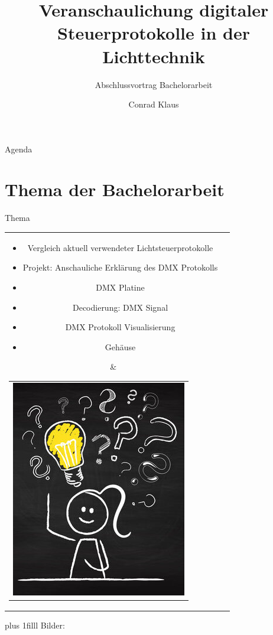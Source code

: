 \documentclass[Nike]{tuberlinbeamer}
\title{Veranschaulichung digitaler Steuerprotokolle in der Lichttechnik}
\subtitle{Abschlussvortrag Bachelorarbeit}
\author[Conrad Klaus]{Conrad Klaus}
\institute{Fachgebiet Lichttechnik}
\newcommand{\customcite}[1]{
	\vskip0pt plus 1filll
	\color{grau}
	\raggedleft \tiny Bilder: \cite{#1}
}
\begin{document}
\begin{frame}
	\maketitle
\end{frame}
\begin{frame}{Agenda}
	\tableofcontents
\end{frame}


\section{Thema der Bachelorarbeit}


\begin{frame}{Thema}
	\begin{tabular}{cl}  
		\parbox{0.45\linewidth}{
			\begin{itemize}
				\item Vergleich aktuell verwendeter Lichtsteuerprotokolle
				\item Projekt: Anschauliche Erklärung des DMX Protokolls
				\item DMX Platine
				\item Decodierung: DMX Signal
				\item DMX Protokoll Visualisierung
				\item Gehäuse
			\end{itemize}
		}
		&
		\begin{tabular}{c}
			\includegraphics[height=\textheight - 13pt]{pictures/Problemstellung}
		\end{tabular}
	\end{tabular}
	\customcite{problemstellung}
\end{frame}
\end{document}
